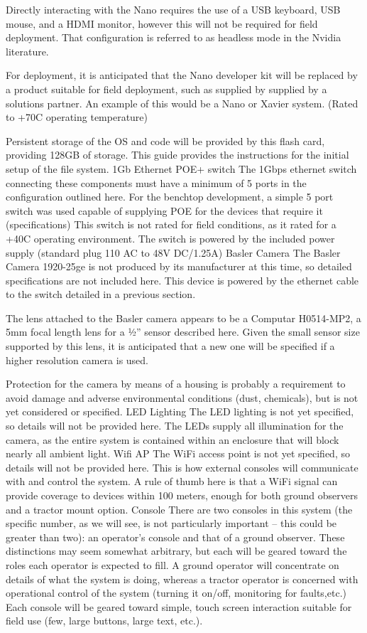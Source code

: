 \documentclass[letterpaper]{article}
\begin{document}
Directly interacting with the Nano requires the use of a USB keyboard, USB mouse, and a HDMI monitor, however this will not be required for field deployment. That configuration is referred to as headless mode in the Nvidia literature.

For deployment, it is anticipated that the Nano developer kit will be replaced by a product suitable for field deployment, such as supplied by supplied by a solutions partner.  An example of this would be a Nano or Xavier system. (Rated to +70C operating temperature)

Persistent storage of the OS and code will be provided by this flash card, providing 128GB of storage.  This guide provides the instructions for the initial setup of the file system.
1Gb Ethernet POE+ switch
The 1Gbps ethernet switch connecting these components must have a minimum of 5 ports in the configuration outlined here. For the benchtop development, a simple 5 port switch was used capable of supplying POE for the devices that require it (specifications)  This switch is not rated for field conditions, as it rated for a +40C operating environment. The switch is powered by the included power supply (standard plug 110 AC to 48V DC/1.25A)
Basler Camera
The Basler Camera 1920-25ge is not produced by its manufacturer at this time, so detailed specifications are not included here.  This device is powered by the ethernet cable to the switch detailed in a previous section.

The lens attached to the Basler camera appears to be a Computar H0514-MP2, a 5mm focal length lens for a ½” sensor described here. Given the small sensor size supported by this lens, it is anticipated that a new one will be specified if a higher resolution camera is used.

Protection for the camera by means of a housing is probably a requirement to avoid damage and adverse environmental conditions (dust, chemicals), but is not yet considered or specified.
LED Lighting
The LED lighting is not yet specified, so details will not be provided here. The LEDs supply all illumination for the camera, as the entire system is contained within an enclosure that will block nearly all ambient light.
Wifi AP
The WiFi access point is not yet specified, so details will not be provided here. This is how external consoles will communicate with and control the system.  A rule of thumb here is that a WiFi signal can provide coverage to devices within 100 meters, enough for both ground observers and a tractor mount option.
Console
There are two consoles in this system (the specific number, as we will see, is not particularly important -- this could be greater than two): an operator’s console and that of a ground observer.  These distinctions may seem somewhat arbitrary, but each will be geared toward the roles each operator is expected to fill. A ground operator will concentrate on details of what the system is doing, whereas a tractor operator is concerned with operational control of the system (turning it on/off, monitoring for faults,etc.) Each console will be geared toward simple, touch screen interaction suitable for field use (few, large buttons, large text, etc.).
\end{document}
